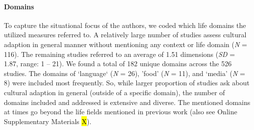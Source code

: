 \paragraph{Domains}

To capture the situational focus of the authors, we coded which life
domains the utilized measures referred to. A relatively large number of
studies assess cultural adaption in general manner without mentioning
any context or life domain (\textit{N} = 116). The remaining studies
referred to an average of 1.51 dimensions (\textit{SD} = 1.87, range: 1
-- 21). We found a total of 182 unique domains across the 526 studies.
The domains of `language` (\textit{N} = 26), 'food' (\textit{N} = 11),
and `media' (\textit{N} = 8) were included most frequently. So, while
larger proportion of studies ask about cultural adaption in general
(outside of a specific domain), the number of domains included and
addressed is extensive and diverse. The mentioned domains at times go
beyond the life fields mentioned in previous work (also see Online
Supplementary Materials \hl{X}).
